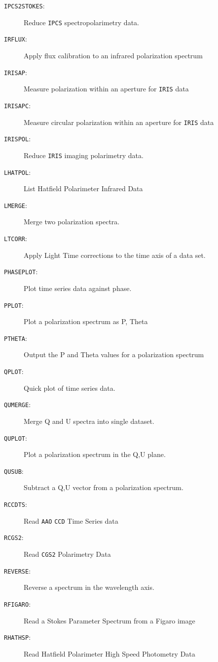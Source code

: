 \documentclass[11pt,twoside,nolof,noabs]{starlink}
\newenvironment{mansectionroutines}{\begin{description}}{\end{description}}
\newcommand{\mansectionitem}[1]{\item[#1:]}
\providecommand{\mantt}[1]{\texttt{#1}}
\begin{document}
\begin{mansectionroutines}
\mansectionitem{{\mantt{IPCS2STOKES}}}
        Reduce {\mantt{IPCS}} spectropolarimetry data.

\mansectionitem{{\mantt{IRFLUX}}}
        Apply flux calibration to an infrared polarization spectrum

\mansectionitem{{\mantt{IRISAP}}}
        Measure polarization within an aperture for {\mantt{IRIS}} data

\mansectionitem{{\mantt{IRISAPC}}}
        Measure circular polarization within an aperture for {\mantt{IRIS}} data

\mansectionitem{{\mantt{IRISPOL}}}
        Reduce {\mantt{IRIS}} imaging polarimetry data.

\mansectionitem{{\mantt{LHATPOL}}}
        List Hatfield Polarimeter Infrared Data

\mansectionitem{{\mantt{LMERGE}}}
        Merge two polarization spectra.

\mansectionitem{{\mantt{LTCORR}}}
        Apply Light Time corrections to the time axis of a data set.

\mansectionitem{{\mantt{PHASEPLOT}}}
        Plot time series data against phase.

\mansectionitem{{\mantt{PPLOT}}}
        Plot a polarization spectrum as P, Theta

\mansectionitem{{\mantt{PTHETA}}}
        Output the P and Theta values for a polarization spectrum

\mansectionitem{{\mantt{QPLOT}}}
        Quick plot of time series data.

\mansectionitem{{\mantt{QUMERGE}}}
        Merge Q and U spectra into single dataset.

\mansectionitem{{\mantt{QUPLOT}}}
        Plot a polarization spectrum in the Q,U plane.

\mansectionitem{{\mantt{QUSUB}}}
        Subtract a Q,U vector from a polarization spectrum.

\mansectionitem{{\mantt{RCCDTS}}}
        Read {\mantt{AAO}} {\mantt{CCD}} Time Series data

\mansectionitem{{\mantt{RCGS2}}}
        Read {\mantt{CGS2}} Polarimetry Data

\mansectionitem{{\mantt{REVERSE}}}
        Reverse a spectrum in the wavelength axis.

\mansectionitem{{\mantt{RFIGARO}}}
        Read a Stokes Parameter Spectrum from a Figaro image

\mansectionitem{{\mantt{RHATHSP}}}
        Read Hatfield Polarimeter High Speed Photometry Data


\end{mansectionroutines}
\end{document}
